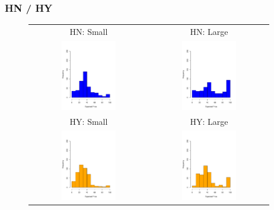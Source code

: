 \documentclass[red]{beamer}
\begin{document}
\begin{frame}
\frametitle{HN / HY}
\begin{figure} [h] 
\begin{center}
\begin{tabular}{c c}
HN: Small & HN: Large \\
\includegraphics[width = 5cm, height = 3.1cm]{HSN (1) (1).pdf} &\includegraphics[width = 5cm, height = 3.1cm]{HLN (1) (1).pdf} \\
HY: Small & HY: Large \\
\includegraphics[width = 5cm, height = 3.1cm]{HSY (1) (1).pdf} & \includegraphics[width = 5cm, height = 3.1cm]{HLY (1) (1).pdf}
\end{tabular}
\end{center}
\end{figure}
\end{frame}





\end{document}
